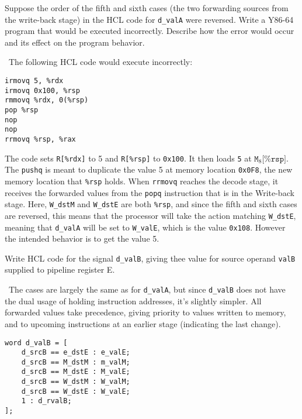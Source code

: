\documentclass[12pt]{article}
\newenvironment{ex}[2][Exercise]{\begin{trivlist}
		\item[\hskip \labelsep {\bfseries #1}\hskip \labelsep {\bfseries #2.}]}{\end{trivlist}}
\newenvironment{sol}[1][Solution]{\begin{trivlist}
		\item[\hskip \labelsep {\bfseries #1:}]}{\end{trivlist}}
\begin{document}
\begin{ex}{4.33}
	Suppose the order of the fifth and sixth cases (the two forwarding sources from
	the write-back stage) in the HCL code for \texttt{d\_valA} were reversed. Write a
	Y86-64 program that would be executed incorrectly. Describe how the error would occur
	and its effect on the program behavior.
\end{ex}

\begin{sol}
	\
	The following HCL code would execute incorrectly:
	\begin{lstlisting}[language={}]
irmovq 5, %rdx
irmovq 0x100, %rsp
rmmovq %rdx, 0(%rsp)
pop %rsp
nop
nop
rrmovq %rsp, %rax
	\end{lstlisting}
	The code sets \texttt{R[\%rdx]} to 5 and \texttt{R[\%rsp]} to \texttt{0x100}.
	It then loads \texttt{5} at $\texttt{M}_8\texttt{[\%rsp]}$. The \texttt{pushq}
	is meant to duplicate the value 5 at memory location \texttt{0x0F8}, the new
	memory location that \texttt{\%rsp} holds. When \texttt{rrmovq} reaches the
	decode stage, it receives the forwarded values from the \texttt{popq} instruction
	that is in the Write-back stage. Here, \texttt{W\_dstM} and \texttt{W\_dstE} are
	both \texttt{\%rsp}, and since the fifth and sixth cases are reversed,
	this means that the processor will take the action matching \texttt{W\_dstE},
	meaning that \texttt{d\_valA} will be set to \texttt{W\_valE}, which is
	the value \texttt{0x108}. However the intended behavior is to get the value
	5.
\end{sol}

\begin{ex}{4.34}
	Write HCL code for the signal \texttt{d\_valB}, giving thee value for source operand
	\texttt{valB} supplied to pipeline register E.
\end{ex}

\begin{sol}
	\
	The cases are largely the same as for \texttt{d\_valA}, but since \texttt{d\_valB}
	does not have the dual usage of holding instruction addresses, it's slightly simpler.
	All forwarded values take precedence, giving priority to values written to memory,
	and to upcoming instructions at an earlier stage (indicating the last change).
	\begin{lstlisting}[language={}]
word d_valB = [
	d_srcB == e_dstE : e_valE;
	d_srcB == M_dstM : m_valM;
	d_srcB == M_dstE : M_valE;
	d_srcB == W_dstM : W_valM;
	d_srcB == W_dstE : W_valE;
	1 : d_rvalB;
];
	\end{lstlisting}
\end{sol}
\end{document}
